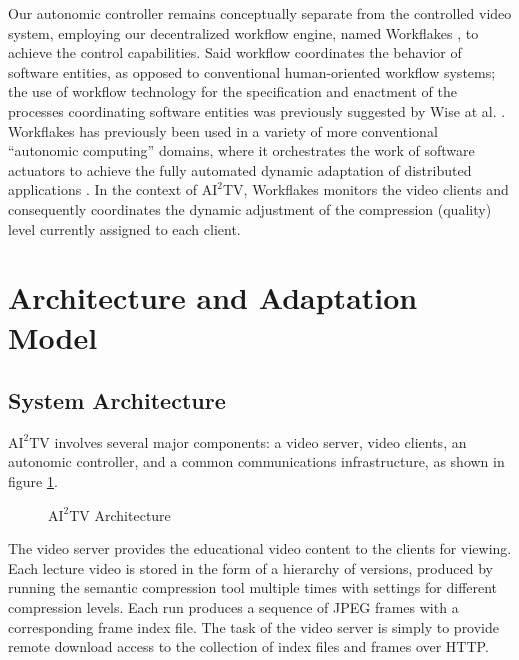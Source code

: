 \documentclass{sig-alternate}
\begin{document}
Our autonomic controller remains conceptually separate from the
controlled video system, employing our decentralized workflow engine,
named Workflakes \cite{ValettoThesis}, to achieve the control
capabilities.  Said workflow coordinates the behavior of software
entities, as opposed to conventional human-oriented workflow systems;
the use of workflow technology for the specification and enactment of
the processes coordinating software entities was previously suggested
by Wise at al. \cite{OSTERWEIL}.  Workflakes has previously been used
in a variety of more conventional ``autonomic computing'' domains,
where it orchestrates the work of software actuators to achieve the
fully automated dynamic adaptation of distributed applications
\cite{ICSE,AMS,AMSJournal}.  In the context of $\mathrm{AI}^2$TV,
Workflakes monitors the video clients and consequently coordinates the
dynamic adjustment of the compression (quality) level currently
assigned to each client.


\section{Architecture and Adaptation\\ Model}

\subsection{System Architecture}


$\mathrm{AI}^2$TV involves several major components: a video server,
video clients, an autonomic controller, and a common communications
infrastructure, as shown in figure \ref{ai2tv_arch}.

\begin{figure}
  \centering
  \caption{$\mathrm{AI}^2$TV Architecture}
  \label{ai2tv_arch}
\end{figure}

The video server provides the educational video content to the clients
for viewing.  Each lecture video is stored in the form of a hierarchy
of versions, produced by running the semantic compression tool
multiple times with settings for different compression levels. Each
run produces a sequence of JPEG frames with a corresponding frame
index file.  The task of the video server is simply to provide remote
download access to the collection of index files and frames over HTTP.
\end{document}

